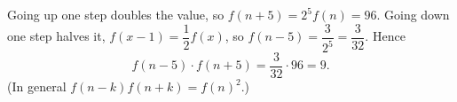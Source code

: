 Going up one step doubles the value, so $f(n+5)=2^5f(n)=96$. Going down one step halves it, $f(x-1)=\dfrac{1}{2}f(x)$, so $f(n-5)=\dfrac{3}{2^5}=\dfrac{3}{32}$. Hence
\[
f(n-5)\cdot f(n+5)=\dfrac{3}{32}\cdot96=\boxed{9}.
\]
(In general $f(n-k)f(n+k)=f(n)^2$.)

